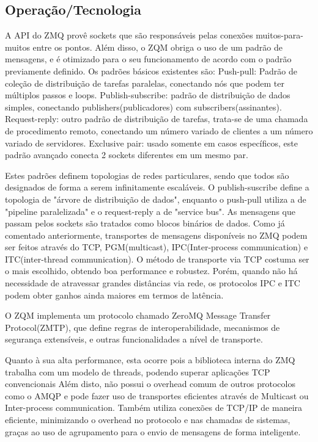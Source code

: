 \documentclass[12pt]{article}
\begin{document}
\subsection{Operação/Tecnologia}
	A API do ZMQ provê sockets que são responsáveis pelas conexões muitos-para-muitos entre os pontos. Além disso, o ZQM obriga o uso de um padrão de mensagens, e é otimizado para o seu funcionamento de acordo com o padrão previamente definido. Os padrões básicos existentes são:
    Push-pull: Padrão de coleção de distribuição de tarefas paralelas, conectando nós que podem ter múltiplos passos e loops. Publish-subscribe: padrão de distribuição de dados simples, conectando publishers(publicadores) com subscribers(assinantes). Request-reply: outro padrão de distribuição de tarefas, trata-se de uma chamada de procedimento remoto, conectando um número variado de clientes a um número variado de servidores. Exclusive pair: usado somente em casos específicos, este padrão avançado conecta 2 sockets diferentes em um mesmo par.
    
    Estes padrões definem topologias de redes particulares, sendo que todos são designados de forma a serem infinitamente escaláveis. O publish-suscribe define a topologia de "árvore de distribuição de dados", enquanto o push-pull utiliza a de "pipeline paralelizada" e o request-reply a de "service bus". As mensagens que passam pelos sockets são tratados como blocos binários de dados. Como já comentado anteriormente, transportes de mensagens disponíveis no ZMQ podem ser feitos através do TCP, PGM(multicast), IPC(Inter-process communication) e ITC(inter-thread communication). O método de transporte via TCP costuma ser o mais escolhido, obtendo boa performance e robustez. Porém, quando não há necessidade de atravessar grandes distâncias via rede, os protocolos IPC e ITC podem obter ganhos ainda maiores em termos de latência. 
    
	O ZQM implementa um protocolo chamado ZeroMQ Message Transfer Protocol(ZMTP), que define regras de interoperabilidade, mecanismos de segurança extensíveis, e outras funcionalidades a nível de transporte.

	Quanto à sua alta performance, esta ocorre pois a biblioteca interna do ZMQ trabalha com um modelo de threads, podendo superar aplicações TCP convencionais Além disto, não possui o overhead comum de outros protocolos como o AMQP e pode fazer uso de transportes eficientes através de Multicast ou Inter-process communication. Também utiliza conexões de TCP/IP de maneira eficiente, minimizando o overhead no protocolo e nas chamadas de sistemas, graças ao uso de agrupamento para o envio de mensagens de forma inteligente.
\end{document}

